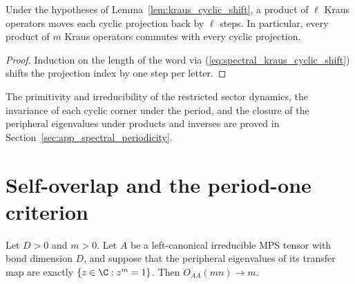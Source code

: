 \begin{lemma}
    \label{thm:eval_word_cyclic_shift}
    \leanok
    Under the hypotheses of Lemma~\ref{lem:kraus_cyclic_shift}, a product of
    $\ell$ Kraus operators moves each cyclic projection back by $\ell$ steps.
    In particular, every product of $m$ Kraus operators commutes with every
    cyclic projection.
\end{lemma}

\begin{proof}\leanok
    Induction on the length of the word via
    (\ref{eq:spectral_kraus_cyclic_shift}) shifts the projection index by one
    step per letter.
\end{proof}

The primitivity and irreducibility of the restricted sector dynamics, the
invariance of each cyclic corner under the period, and the closure of the
peripheral eigenvalues under products and inverses are proved in
Section~\ref{sec:app_spectral_periodicity}.


\section{Self-overlap and the period-one criterion}

\begin{lemma}
    \label{thm:bnt_periodic_self_overlap_tendsto}
    \label{thm:periodic_self_overlap_tendsto}
    \leanok
    Let $D>0$ and $m>0$. Let $A$ be a left-canonical irreducible MPS tensor
    with bond dimension $D$, and suppose that the peripheral eigenvalues of
    its transfer map are exactly $\{z\in\C:z^m=1\}$. Then
    $O_{AA}(mn)\longrightarrow m$.
\end{lemma}


